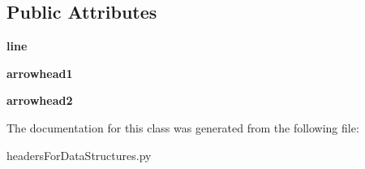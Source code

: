 \subsection*{Public Attributes}
\begin{DoxyCompactItemize}
\item 
\mbox{\label{classheaders_for_data_structures_1_1right_arrow_aee6de10c02c9ea41f85dda3608bc2c29}} 
{\bfseries line}
\item 
\mbox{\label{classheaders_for_data_structures_1_1right_arrow_a8d9040aee6f54367b956a1af7aec6401}} 
{\bfseries arrowhead1}
\item 
\mbox{\label{classheaders_for_data_structures_1_1right_arrow_a057c3637cb94f18827aa4ffa86dd3355}} 
{\bfseries arrowhead2}
\end{DoxyCompactItemize}


The documentation for this class was generated from the following file\+:\begin{DoxyCompactItemize}
\item 
headers\+For\+Data\+Structures.\+py\end{DoxyCompactItemize}
